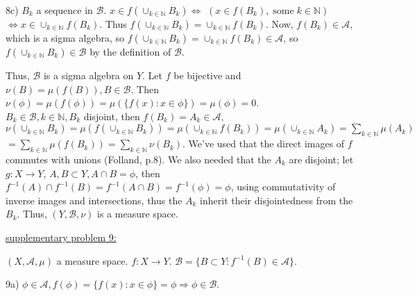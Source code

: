 \documentclass[12pt]{article}
\begin{document}
\begin{flushleft}
8c) $B_k$ a sequence in $\mathcal{B}$. $x \in f(\cup_{k \in \mathbb{N}} B_k) \Leftrightarrow$	
$ \left( x \in f(B_k), \; \textrm{some} \; k \in \mathbb{N} \right)$
$\Leftrightarrow x \in \cup_{k \in \mathbb{N}} f(B_k)$. Thus $f(\cup_{k \in \mathbb{N}} B_k) = \cup_{k \in \mathbb{N}} f(B_k)$. Now, $f(B_k) \in \mathcal{A}$, which is a sigma algebra, so $f(\cup_{k \in \mathbb{N}} B_k) = \cup_{k \in \mathbb{N}} f(B_k)  \in \mathcal{A}$, so $f(\cup_{k \in \mathbb{N}} B_k) \in \mathcal{B}$ by the definition of $\mathcal{B}$.
\end{flushleft}

\begin{flushleft}
Thus, $\mathcal{B}$ is a sigma algebra on $Y$. Let $f$ be bijective and $\nu(B) = \mu(f(B)), B \in \mathcal{B}$. Then $\nu(\phi) = \mu(f(\phi)) = \mu(\{ f(x): x \in \phi \}) = \mu(\phi) = 0$.\\
$B_k \in \mathcal{B}, k\in \mathbb{N}, B_k$ disjoint, then $ f(B_k) = A_k \in \mathcal{A}, $ $ \nu( \cup_{k\in \mathbb{N}} B_k ) = \mu( f( \cup_{k\in \mathbb{N}} B_k) ) = \mu(  \cup_{k\in \mathbb{N}} f( B_k) ) = \mu(  \cup_{k\in \mathbb{N}} A_k ) =  \sum_{k\in \mathbb{N}} \mu( A_k )$ $ = \sum_{k\in \mathbb{N}} \mu( f(B_k) ) = \sum_{k\in \mathbb{N}} \nu( B_k )$. We've used that the direct images of $f$ commutes with unions (Folland, p.8). We also needed that the $A_k$ are disjoint; let $g: X \rightarrow Y$, $A,B \subset Y, A \cap B = \phi$, then $f^{-1}(A) \cap f^{-1}(B) = f^{-1} ( A \cap B ) = f^{-1} (\phi) = \phi $, using commutativity of inverse images and intersections, thus the $A_k$ inherit their disjointedness from the $B_k$.
 Thus, $(Y,\mathcal{B},\nu)$ is a measure space.
\end{flushleft}




\begin{flushleft}
\underline{supplementary problem 9:}
\end{flushleft}

\begin{flushleft}
$(X,\mathcal{A},\mu)$ a measure space. $f: X \rightarrow Y$. $\mathcal{B} = \{ B \subset Y: f^{-1}(B) \in \mathcal{A} \}$.
\end{flushleft}

\begin{flushleft}
9a) $\phi \in \mathcal{A}, f(\phi) = \{ f(x): x \in \phi \} = \phi \Rightarrow \phi \in \mathcal{B}$.
\end{flushleft}
\end{document}
